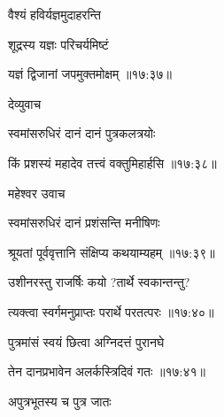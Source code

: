 \nemslokab

{\devanagarifontbold वैश्यं हविर्यज्ञमुदाहरन्ति  \danda\dontdisplaylinenum }%
 
\nemslokac

{\devanagarifontbold शूद्रस्य यज्ञः परिचर्यमिष्टं }%
  \dontdisplaylinenum

\nemslokad

{\devanagarifontbold यज्ञं द्विजानां जपमुक्तमोक्षम् {॥१७:३७॥} \veg\dontdisplaylinenum }%
 

 
\vers


{\devanagarifontbold देव्युवाच {\dandab}\dontdisplaylinenum  }%
 
{\devanagarifontbold स्वमांसरुधिरं दानं दानं पुत्रकलत्रयोः \thinspace{\danda} \dontdisplaylinenum }%
 

{\devanagarifontbold किं प्रशस्यं महादेव तत्त्वं वक्तुमिहार्हसि {॥१७:३८॥} \veg\dontdisplaylinenum }%
  
{\devanagarifontbold महेश्वर उवाच {\dandab}\dontdisplaylinenum  }%
 
{\devanagarifontbold स्वमांसरुधिरं दानं प्रशंसन्ति मनीषिणः \thinspace{\danda} \dontdisplaylinenum }%
 

{\devanagarifontbold श्रूयतां पूर्ववृत्तानि संक्षिप्य कथयाम्यहम् {॥१७:३९॥} \veg\dontdisplaylinenum }%
 
{\devanagarifontbold उशीनरस्तु राजर्षिः कयो ?तार्थे स्वकान्तन्तु?  \thinspace{\dandab} \dontdisplaylinenum }%
 

{\devanagarifontbold त्यक्त्वा स्वर्गमनुप्राप्तः परार्थे परतत्परः {॥१७:४०॥} \veg\dontdisplaylinenum }%
 
{\devanagarifontbold पुत्रमांसं स्वयं छित्वा अग्निदत्तं पुरानघे \thinspace{\dandab} \dontdisplaylinenum }%
 

{\devanagarifontbold तेन दानप्रभावेन अलर्कस्त्रिदिवं गतः {॥१७:४१॥} \veg\dontdisplaylinenum }%
 
\ujvers{}

\nemslokab

{\devanagarifontbold अपुत्रभूतस्य च पुत्र जातः  \danda\dontdisplaylinenum }%
 
